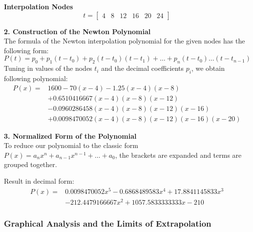 \documentclass{article}
\begin{document}
\vspace{5pt}
\noindent \textbf{Interpolation Nodes} \\
\begin{equation*}
    t = \begin{bmatrix} 4 & 8 & 12 & 16 & 20 & 24 \end{bmatrix}
\end{equation*}

\vspace{5pt}
\noindent \textbf{2. Construction of the Newton Polynomial} \\
The formula of the Newton interpolation polynomial for the given nodes has the following form:
\begin{equation*}
    P(t) = p_0 + p_1(t - t_0) + p_2(t - t_0)(t - t_1) + \dots + p_n(t - t_0)\dots(t - t_{n-1})
\end{equation*}
Tuning in values of the nodes $t_i$ and the decimal coefficients $p_i$, we obtain following polynomial:
\begin{equation}
    \begin{aligned}
        P(x) ={}& 1600 - 70(x - 4) - 1.25(x - 4)(x - 8) \\
        &+ 0.6510416667(x - 4)(x - 8)(x - 12) \\
        &- 0.0960286458(x - 4)(x - 8)(x - 12)(x - 16) \\
        &+ 0.0098470052(x - 4)(x - 8)(x - 12)(x - 16)(x - 20)
    \end{aligned}
\end{equation}

\vspace{5pt}
\noindent \textbf{3. Normalized Form of the Polynomial} \\
To reduce our polynomial to the classic form $P(x) = a_n x^n + a_{n-1} x^{n-1} + \dots + a_0$, the brackets are expanded and terms are grouped together.

\noindent Result in decimal form:
\begin{equation}
    \begin{aligned}
        P(x) ={}& 0.0098470052x^5 - 0.6868489583x^4 + 17.8841145833x^3 \\
        &- 212.4479166667x^2 + 1057.5833333333x - 210
    \end{aligned}
\end{equation}

\subsubsection{Graphical Analysis and the Limits of Extrapolation}
\end{document}
